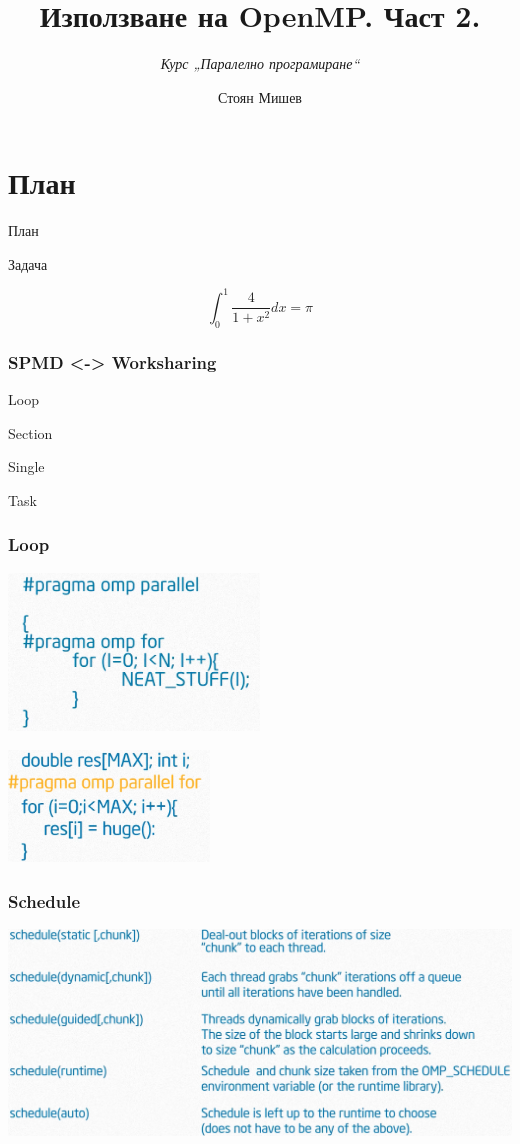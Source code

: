 \documentclass{beamer}
\title{Използване на OpenMP. Част 2.}
\subtitle{\textit{Курс „Паралелно програмиране“}}
\author{\newline \newline Стоян Мишев}
\date{} %
\begin{document}
\lstset{language=Python}
{ 
\frame{\titlepage}}


\section*{План}\begin{frame}{План}\tableofcontents\end{frame}


\begin{frame}[plain]{Задача}

  \begin{equation}
    \int_0^1 \frac{4}{1+x^2} dx = \pi  \nonumber
  \end{equation}
\end{frame}

\begin{frame}
  \frametitle{SPMD <-> Worksharing}
  Loop

  Section

  Single

  Task
\end{frame}


\begin{frame}
  \frametitle{Loop}
  \centering
  \includegraphics[width=0.5\textwidth]{for} 

  \includegraphics[width=0.4\textwidth]{for-short}
\end{frame}

\begin{frame}
  \frametitle{Schedule}
  \includegraphics[width=\textwidth]{schedule}  
\end{frame}
\end{document}
